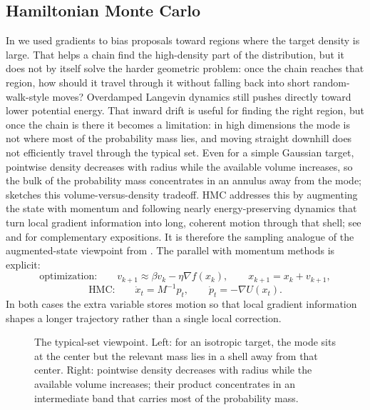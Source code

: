 \subsection{Hamiltonian Monte Carlo}
\label{subsec:hmc}

In  we used gradients to bias proposals toward regions where the target density is large.
That helps a chain find the high-density part of the distribution, but it does not by itself solve the harder geometric problem: once the chain reaches that region, how should it travel through it without falling back into short random-walk-style moves?
Overdamped Langevin dynamics still pushes directly toward lower potential energy.
That inward drift is useful for finding the right region, but once the chain is there it becomes a limitation: in high dimensions the mode is not where most of the probability mass lies, and moving straight downhill does not efficiently travel through the typical set.
Even for a simple Gaussian target, pointwise density decreases with radius while the available volume increases, so the bulk of the probability mass concentrates in an annulus away from the mode;  sketches this volume-versus-density tradeoff.
HMC addresses this by augmenting the state with momentum and following nearly energy-preserving dynamics that turn local gradient information into long, coherent motion through that shell; see \citet[\S3]{betancourt_2017_hmc_conceptual} and \citet[\S\S2--3]{neal_2011_hmc} for complementary expositions.
It is therefore the sampling analogue of the augmented-state viewpoint from .
The parallel with momentum methods is explicit:
\[
  \text{optimization:}\qquad
  v_{k+1}\approx \beta v_k-\eta\nabla f(x_k),
  \qquad
  x_{k+1}=x_k+v_{k+1},
\]
\[
  \text{HMC:}\qquad
  \dot x_t=M^{-1}p_t,
  \qquad
  \dot p_t=-\nabla U(x_t).
\]
In both cases the extra variable stores motion so that local gradient information shapes a longer trajectory rather than a single local correction.

\begin{figure}[H]
  \centering
  
  \caption{The typical-set viewpoint.
  Left: for an isotropic target, the mode sits at the center but the relevant mass lies in a shell away from that center.
  Right: pointwise density decreases with radius while the available volume increases; their product concentrates in an intermediate band that carries most of the probability mass.}
  \label{fig:hmc-concentration}
\end{figure}


